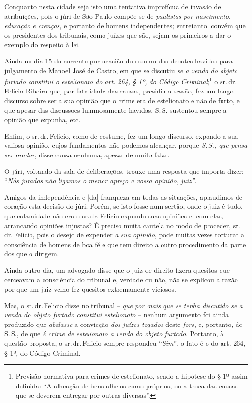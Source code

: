 Conquanto nesta cidade seja isto uma tentativa improfícua de invasão de
atribuições, pois o júri de São Paulo compõe-se de \emph{paulistas por
nascimento}, \emph{educação e crenças}, e portanto de homens
independentes; entretanto, convém que os presidentes dos tribunais, como
juízes que são, sejam os primeiros a dar o exemplo do respeito à lei.

Ainda no dia 15 do corrente por ocasião do resumo dos debates havidos
para julgamento de Manoel José de Castro, em que se discutiu \emph{se a
venda do objeto furtado constitui o estelionato do art. 264, § 1º, do
Código Criminal};\footnote{ Previsão normativa para crimes de
  estelionato, sendo a hipótese do § 1º assim definida: ``A alheação de
  bens alheios como próprios, ou a troca das cousas que se deverem
  entregar por outras diversas''.} o sr.\,dr.\,Felicio Ribeiro que, por
fatalidade das causas, presidia a sessão, fez um longo discurso sobre
ser a sua opinião que o crime era de estelionato e não de furto, e que
apesar das discussões luminosamente havidas, S.\,S. sustentou sempre a
opinião que expunha, etc.

Enfim, o sr.\,dr.\,Felicio, como de costume, fez um longo discurso,
expondo a sua valiosa opinião, cujos fundamentos não podemos alcançar,
porque \emph{S.\,S., que pensa ser orador}, disse cousa nenhuma, apesar
de muito falar.

O júri, voltando da sala de deliberações, trouxe uma resposta que
importa dizer: ``\emph{Nós jurados não ligamos o menor apreço a vossa
opinião, juiz''}.

Amigos da independência e {[}da{]} franqueza em todas as situações,
aplaudimos de coração esta decisão do júri. Porém, se isto fosse num
sertão, onde o juiz é tudo, que calamidade não era o sr.\,dr.\,Felicio
expondo suas opiniões e, com elas, arrancando opiniões injustas? É
preciso muita cautela no modo de proceder, sr.\,dr.\,Felicio, pois o
desejo de expender \emph{a sua opinião}, pode muitas vezes torturar a
consciência de homens de boa fé e que tem direito a outro procedimento
da parte dos que o dirigem.

Ainda outro dia, um advogado disse que o juiz de direito fizera quesitos
que cerceavam a consciência do tribunal e, verdade ou não, não se
explicou a razão por que um juiz velho fez quesitos extremamente
viciosos.

Mas, o sr.\,dr.\,Felicio disse no tribunal -- \emph{que por mais que se
tenha discutido se a venda do objeto furtado constitui estelionato} --
nenhum argumento foi ainda produzido que \emph{abalasse} a convicção
\emph{dos juízes togados} deste \emph{foro}, e, portanto, de S.\,S., de
que \emph{é crime de estelionato a venda do objeto furtado}. Portanto, à
questão proposta, o sr.\,dr.\,Felicio sempre respondeu ``\emph{Sim}'', o
fato é o do art. 264, § 1º, do Código Criminal.

